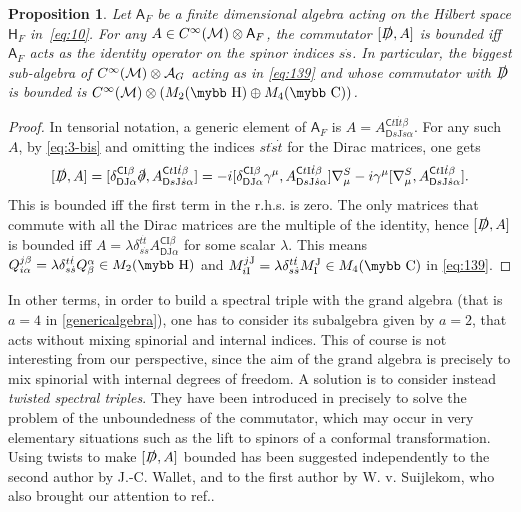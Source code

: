 \documentclass[11pt]{article}
\newcommand{\cinf}{{C^\infty({\cal M})}}
\newcommand{\A}{\mathcal A}
\def\bb#1{\hbox{\mybb#1}}
\newcommand{\del}{\partial}
\newcommand{\sI}{\mathrm  I}
\newcommand{\sJ}{\mathrm J}
\newcommand{\sC}{\mathsf C}
\newcommand{\sD}{\mathsf D}
\newtheorem{prop}{Proposition}[section]
\begin{document}
\begin{prop}
\label{nogo}
 Let ${\mathsf A}_F$ be a finite dimensional algebra acting on the Hilbert space
 ${\mathsf H}_F$ in~\eqref{eq:10}. For any $A\in \cinf\otimes {\mathsf
   A}_F$, the
 commutator $[\slashed D, A]$ is bounded iff
 ${\mathsf A}_F$ acts as the identity operator on
the spinor indices $s \dot s$. In particular, the biggest sub-algebra of
 $\cinf \otimes \A_G$ acting as in \eqref{eq:139} and whose commutator
 with $\slashed D$ is bounded is
 $\cinf\otimes(M_2(\bb H) \oplus M_4(\bb C))$. 
 \end{prop}
 \begin{proof}
   In tensorial notation, a generic element of ${\mathsf A}_F$ is $A=A_{\sD
     s\sJ\dot s\alpha}^{\sC t\sI \dot t\beta}$.  For any such $A$,
by \eqref{eq:3-bis} and omitting  the indices $st\dot s\dot t$ for
the Dirac matrices, one gets
   \begin{equation}
     \label{eq:118}
     [\slashed D, A] =
     [\delta^{\sC\sI\beta}_{\sD\sJ\alpha}\slashed\del ,
     A_{\sD s\sJ\dot s\alpha}^{\sC t\sI \dot t\beta}] =
     -i[\delta^{\sC\sI\beta}_{\sD \sJ \alpha}\gamma^\mu,
     A_{\sD s\sJ\dot s\alpha}^{\sC t\sI \dot t\beta} ]\nabla_\mu^S - i\gamma^\mu[
    \nabla_\mu^S, A_{\sD s\sJ\dot s\alpha}^{\sC t\sI \dot t\beta}].
   \end{equation}
This is bounded iff the first term in the r.h.s. is zero. The only matrices that commute with all the Dirac matrices are the
multiple of the identity, hence $[\slashed D, A]$ is bounded iff $A= \lambda \delta_{s\dot s}^{t\dot t} A^{\sC
  \sI\beta}_{\sD\sJ\alpha}$ for some scalar $\lambda$. This means
$Q^{j\beta}_{i\alpha}=\lambda\delta_{s\dot s}^{t\dot t}
Q^{\alpha}_{\beta}\in M_2(\bb H)$ and
$M_{i\sI}^{j\sJ} =\lambda\delta_{s\dot s}^{t\dot t} M_\sI^\sJ\in M_4(\bb C)$ in \eqref{eq:139}.
\end{proof}

In other terms, in order to build a spectral triple with the
grand algebra (that is $a=4$ in \eqref{genericalgebra}), one has to consider its subalgebra given by
$a=2$, that acts without mixing spinorial and internal indices. This
of course is not interesting
from our perspective, since the aim of the grand  algebra is precisely to mix spinorial with internal degrees
of freedom. A solution is to consider instead \emph{twisted spectral
triples}. They have been introduced in \cite{Connes:1938fk} precisely
to solve the problem of the unboundedness of the commutator, which
may occur in very elementary situations such as the lift to spinors of a
conformal transformation. Using twists to make $[\slashed D, A]$  bounded has been
suggested independently to the second author by J.-C. Wallet, and to
the first author by W. v. Suijlekom, who also brought our attention to ref.\cite{Connes:1938fk}.
\bigskip
\end{document}
